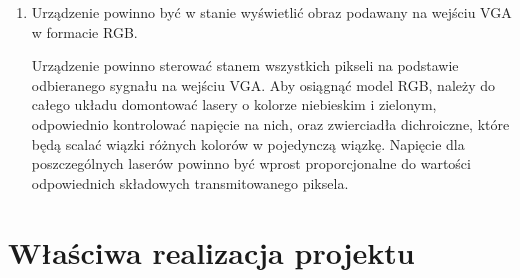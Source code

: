 \documentclass[a4paper,oneside,11pt]{report}
\begin{document}
\begin{enumerate}[1.]
\item Urządzenie powinno być w stanie wyświetlić obraz podawany na wejściu VGA w formacie RGB.

Urządzenie powinno sterować stanem wszystkich pikseli na podstawie odbieranego sygnału na wejściu VGA. Aby osiągnąć model RGB, należy do całego układu domontować lasery o kolorze niebieskim i zielonym, odpowiednio kontrolować napięcie na nich, oraz zwierciadła dichroiczne, które będą scalać wiązki różnych kolorów w pojedynczą wiązkę. Napięcie dla poszczególnych laserów powinno być wprost proporcjonalne do wartości odpowiednich składowych transmitowanego piksela. 

\end{enumerate}
\section{Właściwa realizacja projektu}
\end{document}
